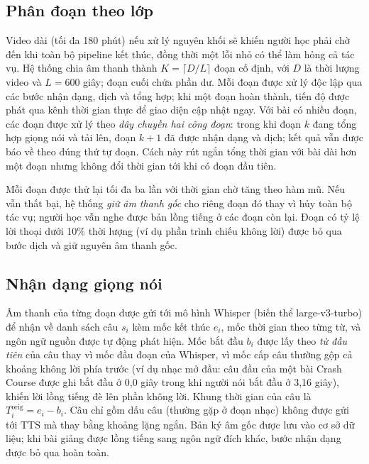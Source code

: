 \documentclass{IEEEtran}
\begin{document}
\subsection{Phân đoạn theo lớp}
Video dài (tối đa 180 phút) nếu xử lý nguyên khối sẽ khiến người học phải chờ đến khi toàn bộ pipeline kết thúc, đồng thời một lỗi nhỏ có thể làm hỏng cả tác vụ. Hệ thống chia âm thanh thành $K = \lceil D / L \rceil$ đoạn cố định, với $D$ là thời lượng video và $L = 600$ giây; đoạn cuối chứa phần dư. Mỗi đoạn được xử lý độc lập qua các bước nhận dạng, dịch và tổng hợp; khi một đoạn hoàn thành, tiến độ được phát qua kênh thời gian thực để giao diện cập nhật ngay. Với bài có nhiều đoạn, các đoạn được xử lý theo \emph{dây chuyền hai công đoạn}: trong khi đoạn $k$ đang tổng hợp giọng nói và tải lên, đoạn $k+1$ đã được nhận dạng và dịch; kết quả vẫn được báo về theo đúng thứ tự đoạn. Cách này rút ngắn tổng thời gian với bài dài hơn một đoạn nhưng không đổi thời gian tới khi có đoạn đầu tiên.

Mỗi đoạn được thử lại tối đa ba lần với thời gian chờ tăng theo hàm mũ. Nếu vẫn thất bại, hệ thống \emph{giữ âm thanh gốc} cho riêng đoạn đó thay vì hủy toàn bộ tác vụ; người học vẫn nghe được bản lồng tiếng ở các đoạn còn lại. Đoạn có tỷ lệ lời thoại dưới 10\% thời lượng (ví dụ phần trình chiếu không lời) được bỏ qua bước dịch và giữ nguyên âm thanh gốc.

\subsection{Nhận dạng giọng nói}
Âm thanh của từng đoạn được gửi tới mô hình Whisper \cite{radford2023whisper} (biến thể large-v3-turbo) để nhận về danh sách câu $s_i$ kèm mốc kết thúc $e_i$, mốc thời gian theo từng từ, và ngôn ngữ nguồn được tự động phát hiện. Mốc bắt đầu $b_i$ được lấy theo \emph{từ đầu tiên} của câu thay vì mốc đầu đoạn của Whisper, vì mốc cấp câu thường gộp cả khoảng không lời phía trước (ví dụ nhạc mở đầu: câu đầu của một bài Crash Course được ghi bắt đầu ở 0,0 giây trong khi người nói bắt đầu ở 3,16 giây), khiến lời lồng tiếng đè lên phần không lời. Khung thời gian của câu là $T_i^{\mathrm{orig}} = e_i - b_i$. Câu chỉ gồm dấu câu (thường gặp ở đoạn nhạc) không được gửi tới TTS mà thay bằng khoảng lặng ngắn. Bản ký âm gốc được lưu vào cơ sở dữ liệu; khi bài giảng được lồng tiếng sang ngôn ngữ đích khác, bước nhận dạng được bỏ qua hoàn toàn.
\end{document}
